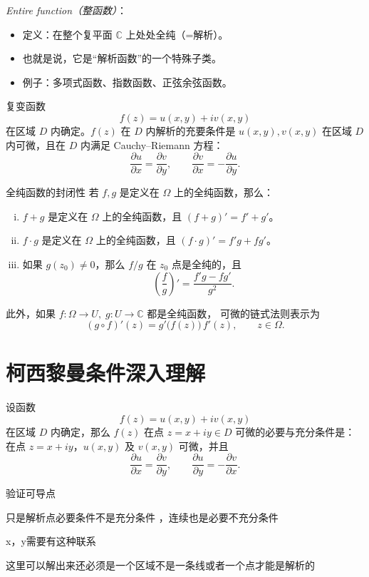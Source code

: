 \documentclass[lang=cn,10pt]{elegantbook}
\begin{document}
\begin{definition}[整函数]
\emph{Entire function（整函数）}：
\begin{itemize}
  \item 定义：在整个复平面 $\mathbb{C}$ 上处处全纯（=解析）。
  \item 也就是说，它是“解析函数”的一个特殊子类。
  \item 例子：多项式函数、指数函数、正弦余弦函数。
\end{itemize}
\end{definition}
\begin{theorem}[解析函数判定方式]
复变函数
\[
f(z) = u(x,y) + i v(x,y)
\]
在区域 $D$ 内确定。$f(z)$ 在 $D$ 内解析的充要条件是  
$u(x,y), v(x,y)$ 在区域 $D$ 内可微，且在 $D$ 内满足 Cauchy--Riemann 方程：
\[
\frac{\partial u}{\partial x} = \frac{\partial v}{\partial y}, 
\qquad 
\frac{\partial v}{\partial x} = - \frac{\partial u}{\partial y}.
\]
\end{theorem}
\begin{theorem}{全纯函数的封闭性}
若 $f, g$ 是定义在 $\Omega$ 上的全纯函数，那么：
\begin{enumerate}[(i)]
  \item $f+g$ 是定义在 $\Omega$ 上的全纯函数，且 $(f+g)' = f' + g'$。
  \item $f \cdot g$ 是定义在 $\Omega$ 上的全纯函数，且 $(f\cdot g)' = f'g + fg'$。
  \item 如果 $g(z_0)\neq 0$，那么 $f/g$ 在 $z_0$ 点是全纯的，且
  \[
     \left(\frac{f}{g}\right)' = \frac{f'g - fg'}{g^2}.
  \]
\end{enumerate}

此外，如果 $f:\Omega \to U,\; g:U \to \mathbb{C}$ 都是全纯函数，  
可微的链式法则表示为
\[
(g\circ f)'(z) = g'\!\bigl(f(z)\bigr)\, f'(z), \qquad z\in \Omega.
\]
\end{theorem}
\section{柯西黎曼条件深入理解}

\begin{theorem}[黎曼柯西 条件]
设函数
\[
f(z) = u(x,y) + i v(x,y)
\]
在区域 $D$ 内确定，那么 $f(z)$ 在点 $z = x+iy \in D$ 可微的必要与充分条件是：  
在点 $z=x+iy$，$u(x,y)$ 及 $v(x,y)$ 可微，并且
\[
\frac{\partial u}{\partial x} = \frac{\partial v}{\partial y}, 
\qquad
\frac{\partial u}{\partial y} = -\frac{\partial v}{\partial x}.
\tag{3.1}
\]
\end{theorem}
\begin{dxtips}
    验证可导点

只是解析点必要条件不是充分条件 ，连续也是必要不充分条件

x，y需要有这种联系

这里可以解出来还必须是一个区域不是一条线或者一个点才能是解析的
\end{dxtips}
\end{document}
